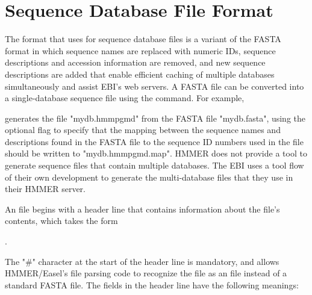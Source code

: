 \documentclass[notoc,justified]{tufte-book}    %
\begin{document}
\section{Sequence Database File Format}
The  format that  uses for sequence database files is a variant of the FASTA format in which sequence names are replaced with numeric IDs, sequence descriptions and accession information are removed, and new sequence descriptions are added that enable efficient caching of multiple databases simultaneously and assist EBI's web servers.  
A FASTA file can be converted into a single-database  sequence file using the  command.  For example, 


generates the  file "mydb.hmmpgmd" from the FASTA file "mydb.fasta", using the optional  flag to specify that the mapping between the sequence names and descriptions found in the FASTA file to the sequence ID numbers used in the  file should be written to "mydb.hmmpgmd.map".  HMMER does not provide a tool to generate sequence files that contain multiple databases.  The EBI uses a tool flow of their own development to generate the multi-database files that they use in their HMMER server.
 

An  file begins with a header line that contains information about the file's contents, which takes the form 

.

The "\#" character at the start of the header line is mandatory, and allows HMMER/Easel's file parsing code to recognize the file as an  file instead of a standard FASTA file.  The fields in the header line have the following meanings:
\end{document}
